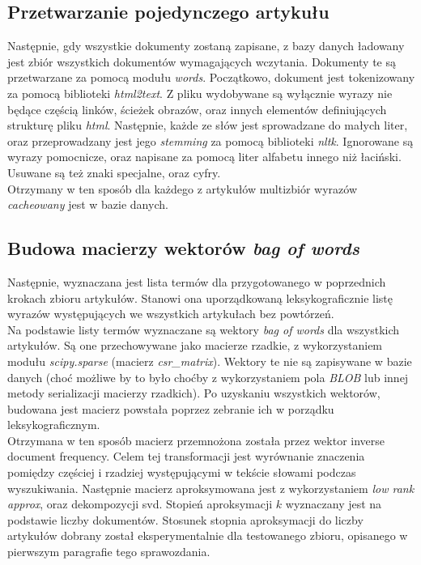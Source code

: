 \documentclass{article}
\begin{document}
        \subsection{Przetwarzanie pojedynczego artykułu}
        Następnie, gdy wszystkie dokumenty zostaną zapisane, z bazy danych ładowany jest zbiór wszystkich dokumentów wymagających wczytania. Dokumenty te są przetwarzane za pomocą modułu \textit{words}. Początkowo, dokument jest tokenizowany za pomocą biblioteki \textit{html2text}. Z pliku wydobywane są wyłącznie wyrazy nie będące częścią linków, ścieżek obrazów, oraz innych elementów definiujących strukturę pliku \textit{html}. Następnie, każde ze słów jest sprowadzane do małych liter, oraz przeprowadzany jest jego \textit{stemming} za pomocą biblioteki \textit{nltk}. Ignorowane są wyrazy pomocnicze, oraz napisane za pomocą liter alfabetu innego niż łaciński. Usuwane są też znaki specjalne, oraz cyfry. \\
        
        Otrzymany w ten sposób dla każdego z artykułów multizbiór wyrazów \textit{cacheowany} jest w bazie danych.
    
        \subsection{Budowa macierzy wektorów \textit{bag of words}}
        Następnie, wyznaczana jest lista termów dla przygotowanego w poprzednich krokach zbioru artykułów. Stanowi ona uporządkowaną leksykograficznie listę wyrazów występujących we wszystkich artykułach bez powtórzeń.\\
        
        Na podstawie listy termów wyznaczane są wektory \textit{bag of words} dla wszystkich artykułów. Są one przechowywane jako macierze rzadkie, z wykorzystaniem modułu \textit{scipy.sparse} (macierz \textit{csr\_matrix}). Wektory te nie są zapisywane w bazie danych (choć możliwe by to było choćby z wykorzystaniem pola \textit{BLOB} lub innej metody serializacji macierzy rzadkich). Po uzyskaniu wszystkich wektorów, budowana jest macierz powstała poprzez zebranie ich w porządku leksykograficznym. \\
        
        Otrzymana w ten sposób macierz przemnożona została przez wektor inverse document frequency. Celem tej transformacji jest wyrównanie znaczenia pomiędzy częściej i rzadziej występującymi w tekście słowami podczas wyszukiwania. Następnie macierz aproksymowana jest z wykorzystaniem \textit{low rank approx}, oraz dekompozycji svd. Stopień aproksymacji $k$ wyznaczany jest na podstawie liczby dokumentów. Stosunek stopnia aproksymacji do liczby artykułów dobrany został eksperymentalnie dla testowanego zbioru, opisanego w pierwszym paragrafie tego sprawozdania. 
        
\end{document}
